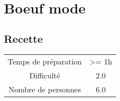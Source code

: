 \newpage
\section{Boeuf mode}
    \label{sec:Boeuf mode}
    \subsection{Recette}
    \vspace{1cm}


    \begin{center}
        \begin{tabular}{c|c}
            Temps de préparation & >= 1h \\
            Difficulté & 2.0 \\
            Nombre de personnes & 6.0 
        \end{tabular}
    \end{center}{}

    \vspace{1cm}
    \hline
    \vspace{1cm}

